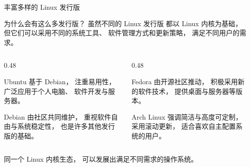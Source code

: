 \documentclass[aspectratio=169]{beamer}
\begin{document}
\begin{frame}[t]{丰富多样的 Linux 发行版}
	
	\begin{block}{为什么会有这么多发行版？}
		\hspace*{2em}虽然不同的 Linux 发行版
		都以 Linux 内核为基础，
		但它们可以采用不同的系统工具、
		软件管理方式和更新策略，
		满足不同用户的需求。
	\end{block}
	\begin{columns}[T,onlytextwidth]
		
		\begin{column}{0.48\textwidth}
			
			\begin{block}{Ubuntu}
				基于 Debian，
				注重易用性，
				广泛应用于个人电脑、
				软件开发与服务器。
			\end{block}
			
			\begin{block}{Debian}
				由社区共同维护，
				重视软件自由与系统稳定性，
				也是许多其他发行版的基础。
			\end{block}
			
		\end{column}
		
		\begin{column}{0.48\textwidth}
			
			\begin{block}{Fedora}
				由开源社区推动，
				积极采用新的软件技术，
				提供桌面与服务器等版本。
			\end{block}
			\begin{block}{Arch Linux}
				强调简洁与高度可定制，
				采用滚动更新，
				适合喜欢自主配置系统的用户。
			\end{block}
			
		\end{column}
		
	\end{columns}
	\begin{center}
		\alert{同一个 Linux 内核生态，
			可以发展出满足不同需求的操作系统。}
	\end{center}
	
\end{frame}
\end{document}
